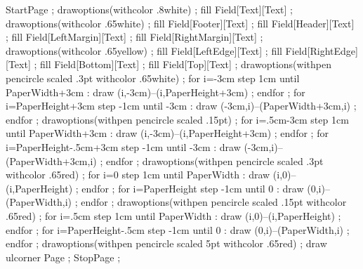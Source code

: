 


  StartPage ; 
    drawoptions(withcolor .8white) ; 
    fill Field[Text][Text] ; 
    drawoptions(withcolor .65white) ; 
    fill Field[Footer][Text] ; 
    fill Field[Header][Text] ; 
    fill Field[LeftMargin][Text] ; 
    fill Field[RightMargin][Text] ; 
    drawoptions(withcolor .65yellow) ; 
    fill Field[LeftEdge][Text] ; 
    fill Field[RightEdge][Text] ; 
    fill Field[Bottom][Text] ; 
    fill Field[Top][Text] ; 
    drawoptions(withpen pencircle scaled .3pt withcolor .65white) ; 
    for i=-3cm step 1cm until PaperWidth+3cm : 
      draw (i,-3cm)--(i,PaperHeight+3cm) ;
    endfor ; 
    for i=PaperHeight+3cm step -1cm until -3cm : 
      draw (-3cm,i)--(PaperWidth+3cm,i) ;
    endfor ; 
    drawoptions(withpen pencircle scaled .15pt) ; 
    for i=.5cm-3cm step 1cm until PaperWidth+3cm : 
      draw (i,-3cm)--(i,PaperHeight+3cm) ;
    endfor ; 
    for i=PaperHeight-.5cm+3cm step -1cm until -3cm : 
      draw (-3cm,i)--(PaperWidth+3cm,i) ;
    endfor ; 
    drawoptions(withpen pencircle scaled .3pt withcolor .65red) ; 
    for i=0 step 1cm until PaperWidth : 
      draw (i,0)--(i,PaperHeight) ;
    endfor ; 
    for i=PaperHeight step -1cm until 0 : 
      draw (0,i)--(PaperWidth,i) ;
    endfor ; 
    drawoptions(withpen pencircle scaled .15pt withcolor .65red) ; 
    for i=.5cm step 1cm until PaperWidth : 
      draw (i,0)--(i,PaperHeight) ;
    endfor ; 
    for i=PaperHeight-.5cm step -1cm until 0 : 
      draw (0,i)--(PaperWidth,i) ;
    endfor ; 
    drawoptions(withpen pencircle scaled 5pt withcolor .65red) ; 
    draw ulcorner Page ; 
  StopPage ;  
\stopuseMPgraphic


\endinput 
